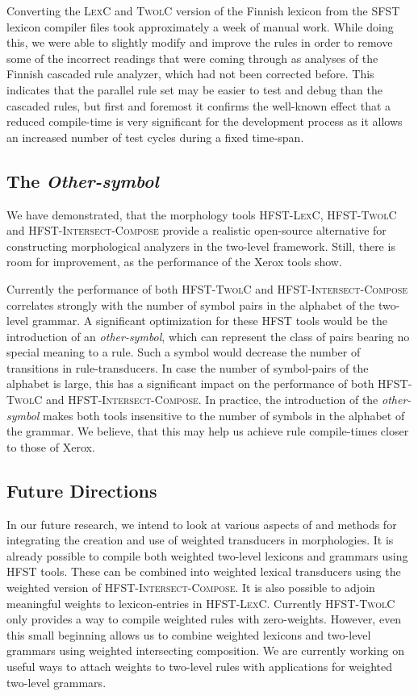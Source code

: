 \documentclass[a4paper]{article}
\begin{document}
Converting the \textsc{LexC} and \textsc{TwolC} version of the Finnish
lexicon from the \textsc{SFST} lexicon compiler files took
approximately a week of manual work. While doing this, we were able to
slightly modify and improve the rules in order to remove some of the
incorrect readings that were coming through as analyses of the Finnish
cascaded rule analyzer, which had not been corrected before. This
indicates that the parallel rule set may be easier to test and debug
than the cascaded rules, but first and foremost it confirms the
well-known effect that a reduced compile-time is very significant for
the development process as it allows an increased number of test
cycles during a fixed time-span.

\subsection{The \textit{Other-symbol}}
 
We have demonstrated, that the morphology tools \textsc{HFST-LexC},
\textsc{HFST-TwolC} and \textsc{HFST-Intersect-Compose} provide a
realistic open-source alternative for constructing morphological
analyzers in the two-level framework. Still, there is room for
improvement, as the performance of the Xerox tools show.

Currently the performance of both \textsc{HFST-TwolC} and
\textsc{HFST-Intersect-Compose} correlates strongly with the number of
symbol pairs in the alphabet of the two-level grammar. A significant
optimization for these \textsc{HFST} tools would be the introduction
of an \textit{other-symbol}, which can represent the class of pairs
bearing no special meaning to a rule. Such a symbol would decrease the
number of transitions in rule-transducers. In case the number of
symbol-pairs of the alphabet is large, this has a significant impact
on the performance of both \textsc{HFST-TwolC} and
\textsc{HFST-Intersect-Compose}. In practice, the introduction of the
\textit{other-symbol} makes both tools insensitive to the number of
symbols in the alphabet of the grammar. We believe, that this may help
us achieve rule compile-times closer to those of Xerox.

\subsection{Future Directions} 

In our future research, we intend to look at various aspects of and
methods for integrating the creation and use of weighted transducers
in morphologies. It is already possible to compile both weighted
two-level lexicons and grammars using \textsc{HFST} tools. These can
be combined into weighted lexical transducers using the weighted
version of \textsc{HFST-Intersect-Compose}. It is also possible to
adjoin meaningful weights to lexicon-entries in \textsc{HFST-LexC}.
Currently \textsc{HFST-TwolC} only provides a way to compile weighted
rules with zero-weights. However, even this small beginning allows us
to combine weighted lexicons and two-level grammars using weighted
intersecting composition. We are currently working on useful ways to
attach weights to two-level rules with applications for weighted
two-level grammars.
\end{document}

